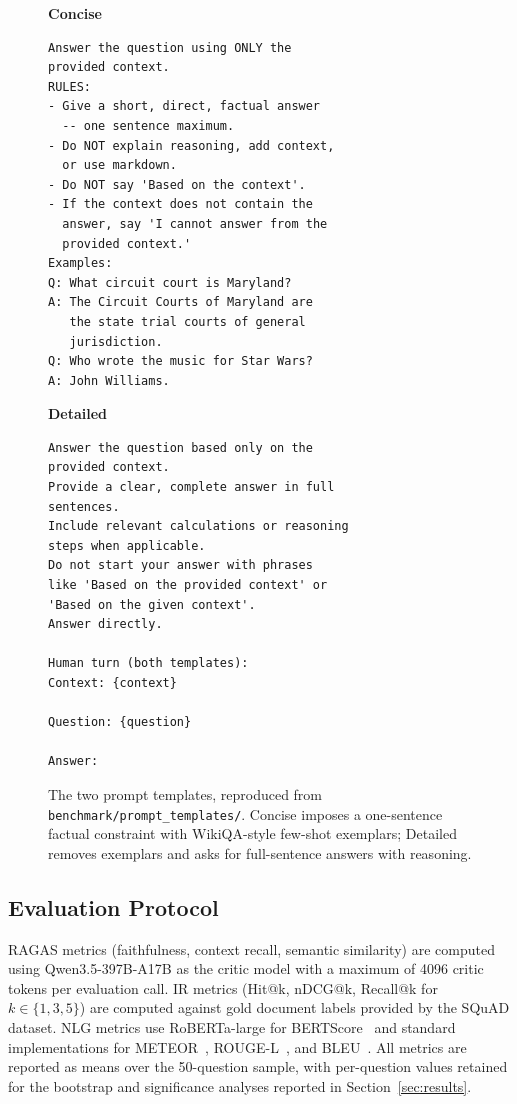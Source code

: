 \begin{figure}[t]
\centering
\begin{minipage}{0.48\textwidth}
\small\textbf{Concise}\\[2pt]
\begin{lstlisting}[style=promptstyle]
Answer the question using ONLY the
provided context.
RULES:
- Give a short, direct, factual answer
  -- one sentence maximum.
- Do NOT explain reasoning, add context,
  or use markdown.
- Do NOT say 'Based on the context'.
- If the context does not contain the
  answer, say 'I cannot answer from the
  provided context.'
Examples:
Q: What circuit court is Maryland?
A: The Circuit Courts of Maryland are
   the state trial courts of general
   jurisdiction.
Q: Who wrote the music for Star Wars?
A: John Williams.
\end{lstlisting}
\end{minipage}\hfill
\begin{minipage}{0.48\textwidth}
\small\textbf{Detailed}\\[2pt]
\begin{lstlisting}[style=promptstyle]
Answer the question based only on the
provided context.
Provide a clear, complete answer in full
sentences.
Include relevant calculations or reasoning
steps when applicable.
Do not start your answer with phrases
like 'Based on the provided context' or
'Based on the given context'.
Answer directly.

Human turn (both templates):
Context: {context}

Question: {question}

Answer:
\end{lstlisting}
\end{minipage}
\caption{The two prompt templates, reproduced from \texttt{benchmark/prompt\_templates/}. Concise imposes a one-sentence factual constraint with WikiQA-style few-shot exemplars; Detailed removes exemplars and asks for full-sentence answers with reasoning.}
\label{fig:prompt-templates}
\end{figure}

\subsection{Evaluation Protocol}

RAGAS metrics (faithfulness, context recall, semantic similarity) are computed using Qwen3.5-397B-A17B as the critic model with a maximum of 4096 critic tokens per evaluation call. IR metrics (Hit@k, nDCG@k, Recall@k for $k \in \{1, 3, 5\}$) are computed against gold document labels provided by the SQuAD dataset. NLG metrics use RoBERTa-large for BERTScore~\cite{zhang2020bertscore} and standard implementations for METEOR~\cite{banerjee2005meteor}, ROUGE-L~\cite{lin2004rouge}, and BLEU~\cite{papineni2002bleu}. All metrics are reported as means over the 50-question sample, with per-question values retained for the bootstrap and significance analyses reported in Section~\ref{sec:results}.


